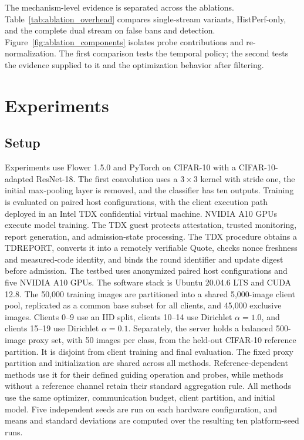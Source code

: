 \documentclass[runningheads,orivec]{llncs}
\begin{document}
The mechanism-level evidence is separated across the ablations. Table~\ref{tab:ablation_overhead} compares single-stream variants, HistPerf-only, and the complete dual stream on false bans and detection. Figure~\ref{fig:ablation_components} isolates probe contributions and re-normalization. The first comparison tests the temporal policy; the second tests the evidence supplied to it and the optimization behavior after filtering.

\section{Experiments}

\subsection{Setup}

Experiments use Flower 1.5.0 and PyTorch on CIFAR-10 with a CIFAR-10-adapted ResNet-18. The first convolution uses a $3\times3$ kernel with stride one, the initial max-pooling layer is removed, and the classifier has ten outputs. Training is evaluated on paired host configurations, with the client execution path deployed in an Intel TDX confidential virtual machine. NVIDIA A10 GPUs execute model training. The TDX guest protects attestation, trusted monitoring, report generation, and admission-state processing. The TDX procedure obtains a TDREPORT, converts it into a remotely verifiable Quote, checks nonce freshness and measured-code identity, and binds the round identifier and update digest before admission. The testbed uses anonymized paired host configurations and five NVIDIA A10 GPUs. The software stack is Ubuntu 20.04.6 LTS and CUDA 12.8. The 50,000 training images are partitioned into a shared 5,000-image client pool, replicated as a common base subset for all clients, and 45,000 exclusive images. Clients 0--9 use an IID split, clients 10--14 use Dirichlet $\alpha=1.0$, and clients 15--19 use Dirichlet $\alpha=0.1$. Separately, the server holds a balanced 500-image proxy set, with 50 images per class, from the held-out CIFAR-10 reference partition. It is disjoint from client training and final evaluation. The fixed proxy partition and initialization are shared across all methods. Reference-dependent methods use it for their defined guiding operation and probes, while methods without a reference channel retain their standard aggregation rule. All methods use the same optimizer, communication budget, client partition, and initial model. Five independent seeds are run on each hardware configuration, and means and standard deviations are computed over the resulting ten platform-seed runs.
\end{document}

